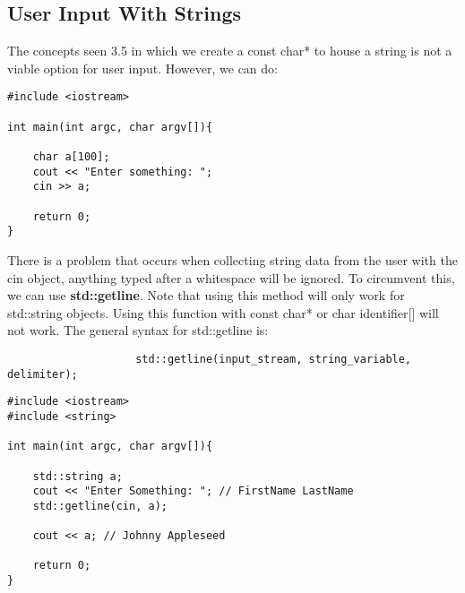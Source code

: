 \documentclass{report}
\begin{document}
    \subsection{User Input With Strings}
    \bigbreak \noindent 
    \begin{Remark}
        The concepts seen 3.5 in which we create a const char* to house a string is not a viable option for user input. However, we can do:
        \bigbreak \noindent 
        \sepline
        \begin{verbatim}
#include <iostream>

int main(int argc, char argv[]){

    char a[100];
    cout << "Enter something: ";
    cin >> a;

    return 0;
}
        \end{verbatim}
        \sepline
    \end{Remark}
    \bigbreak \noindent 
    \bigbreak \noindent 
    There is a problem that occurs when collecting string data from the user with the cin object, anything typed after a whitespace will be ignored. To circumvent this, we can use \textbf{std::getline}. Note that using this method will only work for std::string objects. Using this function with const char* or char identifier[] will not work.
    \bigbreak \noindent 
    The general syntax for std::getline is:
    \smallbreak \noindent
    \sepline
    \begin{verbatim}
                    std::getline(input_stream, string_variable, delimiter);
    \end{verbatim}
    \bigbreak \noindent 
    \sepline
    \bigbreak \noindent 
    \sepline
    \begin{verbatim}
#include <iostream>
#include <string>

int main(int argc, char argv[]){

    std::string a;
    cout << "Enter Something: "; // FirstName LastName
    std::getline(cin, a);

    cout << a; // Johnny Appleseed

    return 0;
}
    \end{verbatim}
    \sepline

    \pagebreak \bigbreak \noindent 
\end{document}
